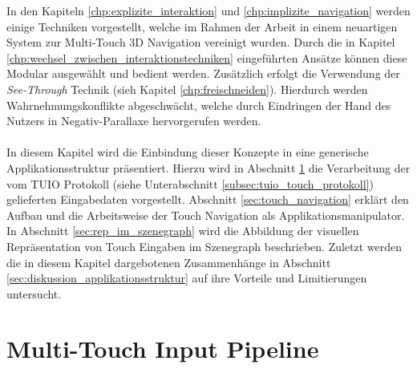 In den Kapiteln \ref{chp:explizite_interaktion} und \ref{chp:implizite_navigation} werden einige Techniken vorgestellt, welche im Rahmen der Arbeit in einem neuartigen System zur Multi-Touch 3D Navigation vereinigt wurden. Durch die in Kapitel \ref{chp:wechsel_zwischen_interaktionstechniken} eingeführten Ansätze können diese Modular ausgewählt und bedient werden. Zusätzlich erfolgt die Verwendung der \emph{See-Through} Technik (sieh Kapitel \ref{chp:freischneiden}). Hierdurch werden Wahrnehmungskonflikte abgeschwächt, welche durch Eindringen der Hand des Nutzers in Negativ-Parallaxe hervorgerufen werden.
\\\\
In diesem Kapitel wird die Einbindung dieser Konzepte in eine generische Applikationsstruktur präsentiert. Hierzu wird in Abschnitt \ref{sec:multitouch_input_pipeline} die Verarbeitung der vom TUIO Protokoll (siehe Unterabschnitt \ref{subsec:tuio_touch_protokoll}) gelieferten Eingabedaten vorgestellt. Abschnitt \ref{sec:touch_navigation} erklärt den Aufbau und die Arbeitsweise der Touch Navigation als Applikationsmanipulator. In Abschnitt \ref{sec:rep_im_szenegraph} wird die Abbildung der visuellen Repräsentation von Touch Eingaben im Szenegraph beschrieben. Zuletzt werden die in diesem Kapitel dargebotenen Zusammenhänge in Abschnitt \ref{sec:diskussion_applikationsstruktur} auf ihre Vorteile und Limitierungen untersucht.  

\section{Multi-Touch Input Pipeline}
\label{sec:multitouch_input_pipeline}


